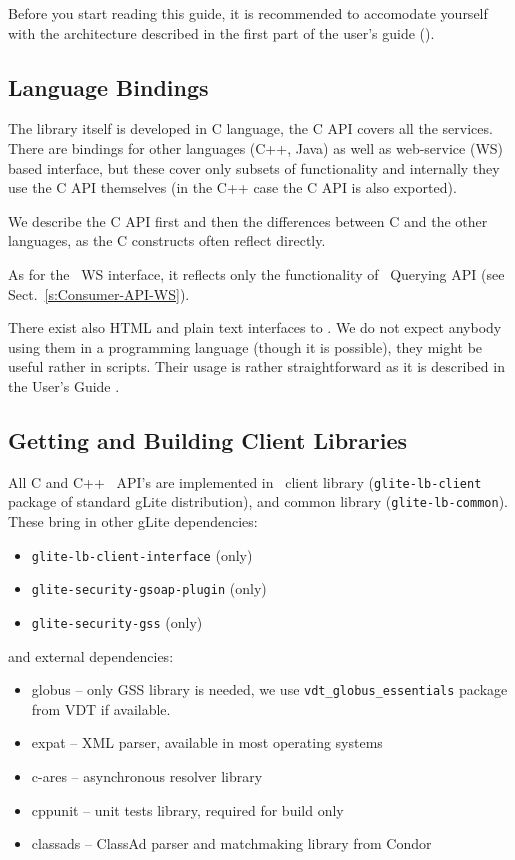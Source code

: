 %
Before you start reading this guide, it is recommended to accomodate
yourself with the \LB architecture described in the first part of the
\LB user's guide (\cite{lbug}).


\subsection{Language Bindings}
The \LB library itself is developed in C language, the C API covers
all the \LB services. There are bindings for other languages (C++,
Java) as well as web-service (WS) based interface, but these cover only
subsets of \LB functionality and internally they use the C API
themselves (in the C++ case the C API is also exported).

We describe the C API first and then the differences between C and the
other languages, as the C constructs often reflect directly.

As for the \LB\ WS interface, it reflects only the functionality of 
\LB\ Querying API (see Sect.~\ref{s:Consumer-API-WS}). 

There exist also HTML and plain text interfaces to \LB. We do not expect anybody using them 
in a programming language (though it is possible), they might be useful rather in
scripts. Their usage is rather straightforward as it is described in the User's Guide \cite{lbug}.


\subsection{Getting and Building Client Libraries}

All C and C++ \LB\ API's  are implemented in \LB\ client library
(\verb'glite-lb-client' package of standard gLite distribution),
and \LB common library (\verb'glite-lb-common'). 
These bring in other gLite dependencies:
\begin{itemize}
\item \verb'glite-lb-client-interface' (\LBold only)
\item \verb'glite-security-gsoap-plugin' (\LBold only)
\item \verb'glite-security-gss' (\LBnew only)
\end{itemize}
and external dependencies:
\begin{itemize}
\item globus -- only GSS library is needed, we use 
\verb'vdt_globus_essentials' package from VDT if available.
\item expat -- XML parser, available in most operating systems
\item c-ares -- asynchronous resolver library
\item cppunit -- unit tests library, required for build only
\item classads -- ClassAd parser and matchmaking library from Condor
\end{itemize}

